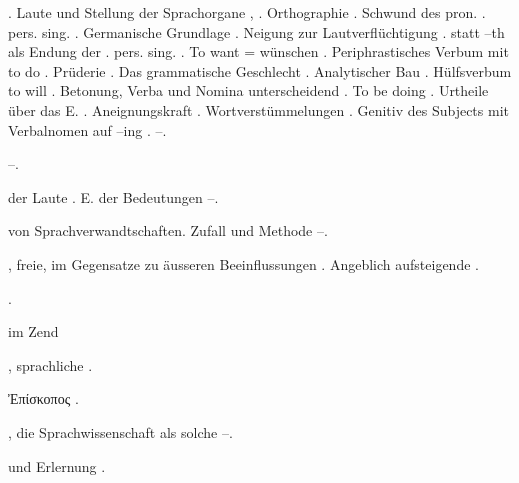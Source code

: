 \begin{register}
. Laute und Stellung der Sprachorgane \pageref{sp.34}, \pageref{sp.36}. Orthographie \pageref{sp.133}. Schwund des pron. \pageref{sp.2}. pers. sing. \pageref{sp.152}. Germanische Grundlage \pageref{sp.158}. Neigung zur Lautverflüchtigung \pageref{sp.207}.  statt –th als Endung der \pageref{sp.3}. pers. sing. \pageref{sp.213}. To want = wünschen \pageref{sp.222}. Periphrastisches Verbum mit to do \pageref{sp.239}. Prüderie \pageref{sp.249}. Das grammatische Geschlecht \pageref{sp.254}. Analytischer Bau \pageref{sp.257}. Hülfsverbum to will \pageref{sp.316}.  Betonung, Verba und Nomina unterscheidend \pageref{sp.379}. To be doing \pageref{sp.384}. Urtheile über das E. \pageref{sp.393}. Aneignungskraft \pageref{sp.429}.  Wortverstümmelungen \pageref{sp.433}. Genitiv des Subjects mit Verbalnomen auf –ing \pageref{sp.467}.  \pageref{sp.474}–\pageref{sp.475}.

 \pageref{sp.348}–\pageref{sp.349}.

 der Laute \pageref{sp.200}. E. der Bedeutungen \pageref{sp.238}–\pageref{sp.239}.

 von Sprachverwandtschaften. Zufall und Methode \pageref{sp.144}–\pageref{sp.145}.


,  freie, im Gegensatze zu äusseren Beeinflussungen \pageref{sp.178}. Angeblich aufsteigende \pageref{sp.415}.

 \sed{\pageref{sp.28},} \pageref{sp.74}.

 im Zend \pageref{sp.199}

, sprachliche \pageref{sp.274}.

Ἐπίσκοπος \pageref{sp.231}.

, die Sprach\-wissenschaft als solche \pageref{sp.10}–\pageref{sp.11}.

 und Erlernung \pageref{sp.75}.


\end{register}
